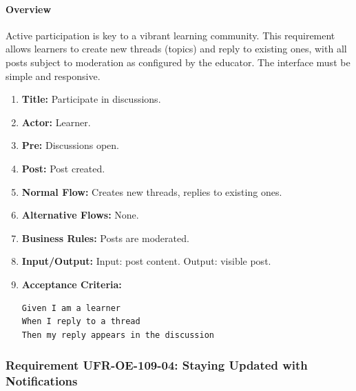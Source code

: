 \paragraph{Overview}
Active participation is key to a vibrant learning community. This requirement allows learners to create new threads (topics) and reply to existing ones, with all posts subject to moderation as configured by the educator. The interface must be simple and responsive.
\begin{enumerate}[label=\textbf{\arabic*.}]
\item \textbf{Title:} Participate in discussions.
\item \textbf{Actor:} Learner.
\item \textbf{Pre:} Discussions open.
\item \textbf{Post:} Post created.
\item \textbf{Normal Flow:} Creates new threads, replies to existing ones.
\item \textbf{Alternative Flows:} None.
\item \textbf{Business Rules:} Posts are moderated.
\item \textbf{Input/Output:} Input: post content. Output: visible post.
\item \textbf{Acceptance Criteria:}
    \begin{verbatim}
Given I am a learner
When I reply to a thread
Then my reply appears in the discussion
    \end{verbatim}
\end{enumerate}

\subsubsection{Requirement UFR-OE-109-04: Staying Updated with Notifications}
